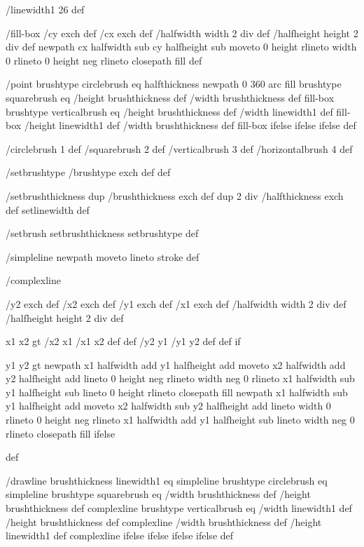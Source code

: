 
/linewidth1 26 def

/fill-box
  { /cy exch def /cx exch def
    /halfwidth width 2 div def
    /halfheight height 2 div def
    newpath
     cx halfwidth sub cy halfheight sub moveto
     0 height rlineto
     width 0 rlineto
     0 height neg rlineto
     closepath
     fill } def

/point
  { brushtype circlebrush eq
     { halfthickness newpath 0 360 arc fill }
     { brushtype squarebrush eq
        { /height brushthickness def
	  /width brushthickness def
	  fill-box }
        { brushtype verticalbrush eq
           { /height brushthickness def
	     /width linewidth1 def
	     fill-box }
           { /height linewidth1 def
	     /width brushthickness def
	     fill-box }
	   ifelse }
        ifelse }
     ifelse } def

/circlebrush     1 def
/squarebrush     2 def
/verticalbrush   3 def
/horizontalbrush 4 def

/setbrushtype { /brushtype exch def } def

/setbrushthickness
  { dup /brushthickness exch def
    dup 2 div /halfthickness exch def
    setlinewidth } def

/setbrush { setbrushthickness setbrushtype } def

/simpleline { newpath moveto lineto stroke } def

/complexline
  { /y2 exch def /x2 exch def
    /y1 exch def /x1 exch def
    /halfwidth width 2 div def
    /halfheight height 2 div def

    x1 x2 gt { /x2 x1 /x1 x2 def def /y2 y1 /y1 y2 def def } if

    y1 y2 gt
     { %
       newpath
        x1 halfwidth add y1 halfheight add moveto
	x2 halfwidth add y2 halfheight add lineto
	0 height neg rlineto
        width neg 0 rlineto
        x1 halfwidth sub y1 halfheight sub lineto
        0 height rlineto
        closepath
	fill }
     { %
       newpath
        x1 halfwidth sub y1 halfheight add moveto
	x2 halfwidth sub y2 halfheight add lineto
	width 0 rlineto
	0 height neg rlineto
	x1 halfwidth add y1 halfheight sub lineto
	width neg 0 rlineto
	closepath
	fill }
     ifelse } def

/drawline
  { brushthickness linewidth1 eq
    { simpleline }
    { brushtype circlebrush eq
       { %
         simpleline }
       { brushtype squarebrush eq
          { %
            /width brushthickness def
	    /height brushthickness def
	    complexline }
          { brushtype verticalbrush eq
             { %
	       /width linewidth1 def
	       /height brushthickness def
	       complexline }
             { %
	       /width brushthickness def
	       /height linewidth1 def
	       complexline }
             ifelse }
          ifelse }
       ifelse }
    ifelse } def

